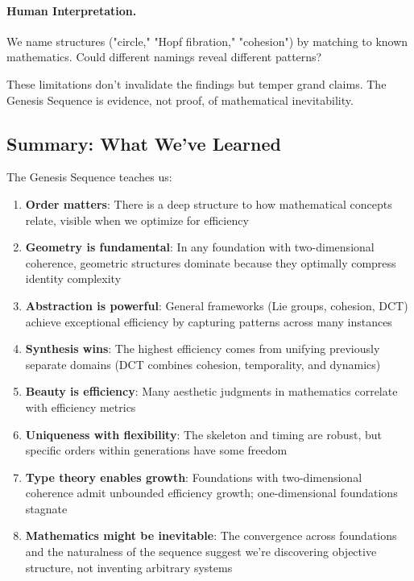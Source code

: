 \documentclass[11pt]{article}
\theoremstyle{definition}
\begin{document}
\paragraph{Human Interpretation.}
We name structures ("circle," "Hopf fibration," "cohesion") by matching to known mathematics. Could different namings reveal different patterns?

These limitations don't invalidate the findings but temper grand claims. The Genesis Sequence is evidence, not proof, of mathematical inevitability.

\subsection{Summary: What We've Learned}

The Genesis Sequence teaches us:

\begin{enumerate}
\item \textbf{Order matters}: There is a deep structure to how mathematical concepts relate, visible when we optimize for efficiency

\item \textbf{Geometry is fundamental}: In any foundation with two-dimensional coherence, geometric structures dominate because they optimally compress identity complexity

\item \textbf{Abstraction is powerful}: General frameworks (Lie groups, cohesion, DCT) achieve exceptional efficiency by capturing patterns across many instances

\item \textbf{Synthesis wins}: The highest efficiency comes from unifying previously separate domains (DCT combines cohesion, temporality, and dynamics)

\item \textbf{Beauty is efficiency}: Many aesthetic judgments in mathematics correlate with efficiency metrics

\item \textbf{Uniqueness with flexibility}: The skeleton and timing are robust, but specific orders within generations have some freedom

\item \textbf{Type theory enables growth}: Foundations with two-dimensional coherence admit unbounded efficiency growth; one-dimensional foundations stagnate

\item \textbf{Mathematics might be inevitable}: The convergence across foundations and the naturalness of the sequence suggest we're discovering objective structure, not inventing arbitrary systems
\end{enumerate}
\end{document}
